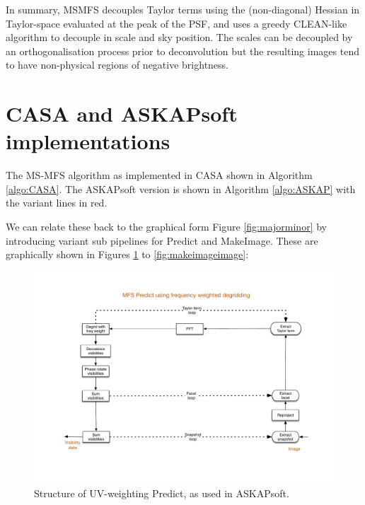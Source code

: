 \documentclass[11pt,a4paper,variablewidth]{article}
\begin{document}
In summary, MSMFS decouples Taylor terms using the (non-diagonal) Hessian in Taylor-space evaluated at the peak of the PSF, and uses a greedy CLEAN-like algorithm to decouple in scale and sky position. The scales can be decoupled by an orthogonalisation process prior to deconvolution but the resulting images tend to have non-physical regions of negative brightness.



\clearpage
\section{CASA and ASKAPsoft implementations}

The MS-MFS algorithm as implemented in CASA shown in Algorithm \ref{algo:CASA}. The ASKAPsoft version is shown in Algorithm \ref{algo:ASKAP} with the variant lines in red.

We can relate these back to the graphical form Figure \ref{fig:majorminor} by introducing variant sub pipelines for Predict and MakeImage. These are graphically shown in Figures \ref{fig:predictuv} to \ref{fig:makeimageimage}: 

\begin{figure}[htb]
  \centering
  \includegraphics[width=\textwidth]{./MSMFS_Predict_UV.pdf}
  \caption{Structure of UV-weighting Predict, as used in ASKAPsoft. }
  \label{fig:predictuv}
\end{figure}
\end{document}
